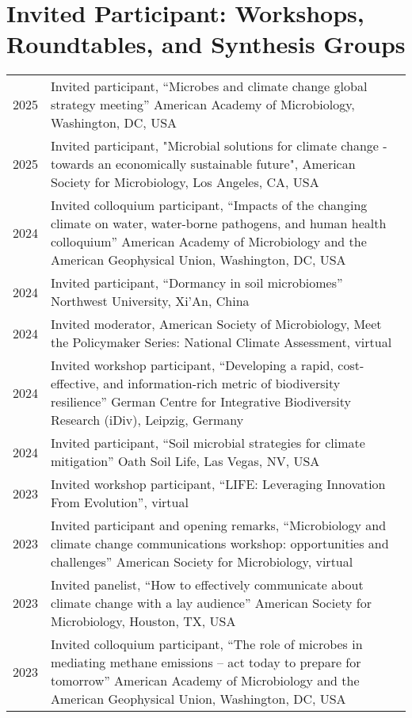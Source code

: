 \documentclass[11pt]{article}
\begin{document}
\section*{Invited Participant: Workshops, Roundtables, and Synthesis Groups}
\vspace{-1.25em} %
\noindent
\begin{longtable}{@{}p{2cm}@{\hspace{1em}}p{14cm}@{}}
2025 & Invited participant, “Microbes and climate change global strategy meeting” American Academy of Microbiology, Washington, DC, USA \\
2025 & Invited participant, "Microbial solutions for climate change - towards an economically sustainable future", American Society for Microbiology, Los Angeles, CA, USA \\
2024 & Invited colloquium participant, “Impacts of the changing climate on water, water-borne pathogens, and human health colloquium” American Academy of Microbiology and the American Geophysical Union, Washington, DC, USA \\
2024 & Invited participant, “Dormancy in soil microbiomes” Northwest University, Xi’An, China \\
2024 & Invited moderator, American Society of Microbiology, Meet the Policymaker Series: National Climate Assessment, virtual \\
2024 & Invited workshop participant, “Developing a rapid, cost-effective, and information-rich metric of biodiversity resilience” German Centre for Integrative Biodiversity Research (iDiv), Leipzig, Germany \\
2024 & Invited participant, “Soil microbial strategies for climate mitigation” Oath Soil Life, Las Vegas, NV, USA \\
2023 & Invited workshop participant, “LIFE: Leveraging Innovation From Evolution”, virtual \\
2023 & Invited participant and opening remarks, “Microbiology and climate change communications workshop: opportunities and challenges” American Society for Microbiology, virtual \\
2023 & Invited panelist, “How to effectively communicate about climate change with a lay audience” American Society for Microbiology, Houston, TX, USA \\
2023 & Invited colloquium participant, “The role of microbes in mediating methane emissions – act today to prepare for tomorrow” American Academy of Microbiology and the American Geophysical Union, Washington, DC, USA \\

\end{longtable}
\end{document}
